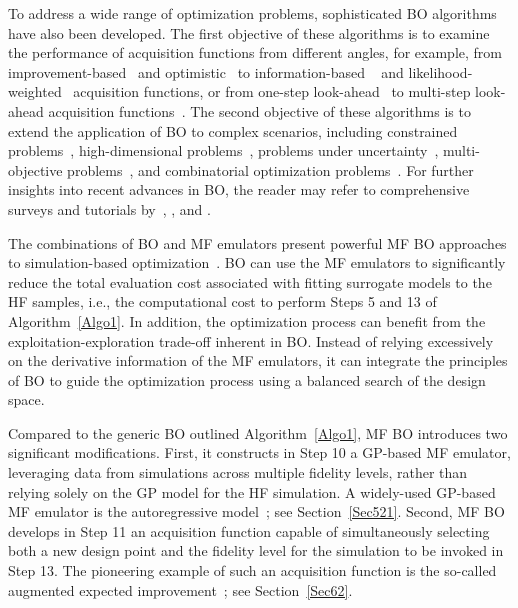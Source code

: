 \documentclass[iicol,sn-basic]{sn-jnl}%
\theoremstyle{thmstyleone}%
\theoremstyle{thmstyletwo}
\theoremstyle{thmstylethree}
\begin{document}
\begin{linenumbers}
To address a wide range of optimization problems, sophisticated BO algorithms have also been developed.
The first objective of these algorithms is to examine the performance of acquisition functions from different angles, for example, from improvement-based~\citep{Jones1998,Jones2001,Sobester2005,Frazier2008,ZChen2023} and optimistic~\citep{Srinivas2010,Kaufmann2012} to information-based ~\citep{Viana2009,Hennig2012,Lobato2014,ZWang2017} and likelihood-weighted~\citep{Blanchard2021} acquisition functions, or from one-step look-ahead~\citep{Jones1998,Sobester2005} to multi-step look-ahead acquisition functions~\citep{Lam2016,Lee2020,Paulson2022,Gonzalez2016,Jiang2020}.
The second objective of these algorithms is to extend the application of BO to complex scenarios, including constrained problems~\citep{Schonlau1998,Gramacy2011,Picheny2014,Gramacy2016}, high-dimensional problems~\citep{Eriksson2019,Eriksson2021,Daulton2022a}, problems under uncertainty~\citep{Huang2006a,Picheny2013,Forrester2006,Scott2011,Daulton2021,Daulton2022b}, multi-objective problems~\citep{Knowles2006,QZhang2010,Couckuyt2014,Bradford2018,Daulton2020,Picheny2015}, and combinatorial optimization problems~\citep{GomezBombarelli2018,GarridoMerchan2020}.
For further insights into recent advances in BO, the reader may refer to comprehensive surveys and tutorials by~\cite{Shahriari2016}, \cite{Frazier2018}, and \cite{Wang2023}.

The combinations of BO and MF emulators present powerful MF BO approaches to simulation-based optimization~\citep{Huang2006,Forrester2007,Perdikaris2016,Chen2016}.
BO can use the MF emulators to significantly reduce the total evaluation cost associated with fitting surrogate models to the HF samples, i.e., the computational cost to perform Steps 5 and 13 of Algorithm~\ref{Algo1}.
In addition, the optimization process can benefit from the exploitation-exploration trade-off inherent in BO.
Instead of relying excessively on the derivative information of the MF emulators, it can integrate the principles of BO to guide the optimization process using a balanced search of the design space.

Compared to the generic BO outlined Algorithm~\ref{Algo1}, MF BO introduces two significant modifications.
First, it constructs in Step 10 a GP-based MF emulator, leveraging data from simulations across multiple fidelity levels, rather than relying solely on the GP model for the HF simulation.
A widely-used GP-based MF emulator is the autoregressive model~\citep{Kennedy2000}; see Section~\ref{Sec521}.
Second, MF BO develops in Step 11 an acquisition function capable of simultaneously selecting both a new design point and the fidelity level for the simulation to be invoked in Step 13.
The pioneering example of such an acquisition function is the so-called augmented expected improvement~\citep{Huang2006}; see Section~\ref{Sec62}.


\end{linenumbers}
\end{document}
